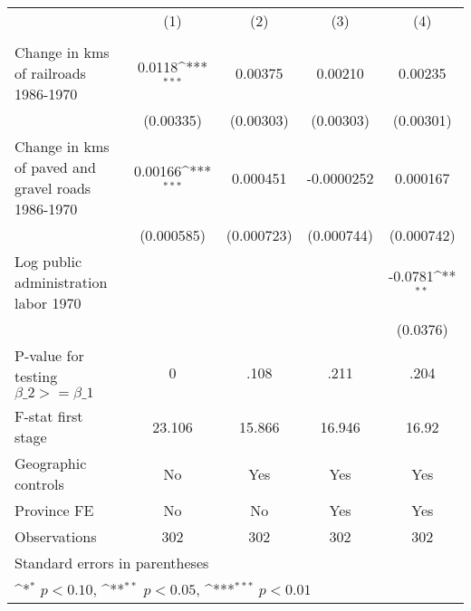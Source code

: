 {
\def\sym#1{\ifmmode^{#1}\else\(^{#1}\)\fi}
\begin{tabular}{l*{4}{c}}
\hline\hline
                &\multicolumn{1}{c}{(1)}&\multicolumn{1}{c}{(2)}&\multicolumn{1}{c}{(3)}&\multicolumn{1}{c}{(4)}\\
                &\multicolumn{1}{c}{}&\multicolumn{1}{c}{}&\multicolumn{1}{c}{}&\multicolumn{1}{c}{}\\
\hline
Change in kms of railroads 1986-1970&   0.0118\sym{***}&  0.00375         &  0.00210         &  0.00235         \\
                &(0.00335)         &(0.00303)         &(0.00303)         &(0.00301)         \\
[1em]
Change in kms of paved and gravel roads 1986-1970&  0.00166\sym{***}& 0.000451         &-0.0000252         & 0.000167         \\
                &(0.000585)         &(0.000723)         &(0.000744)         &(0.000742)         \\
[1em]
Log public administration labor 1970&                  &                  &                  &  -0.0781\sym{**} \\
                &                  &                  &                  & (0.0376)         \\
\hline
P-value for testing $\beta\_{2} >= \beta\_{1}$&        0         &     .108         &     .211         &     .204         \\
F-stat first stage&   23.106         &   15.866         &   16.946         &    16.92         \\
Geographic controls&       No         &      Yes         &      Yes         &      Yes         \\
Province FE     &       No         &       No         &      Yes         &      Yes         \\
Observations    &      302         &      302         &      302         &      302         \\
\hline\hline
\multicolumn{5}{l}{\footnotesize Standard errors in parentheses}\\
\multicolumn{5}{l}{\footnotesize \sym{*} \(p<0.10\), \sym{**} \(p<0.05\), \sym{***} \(p<0.01\)}\\
\end{tabular}
}
